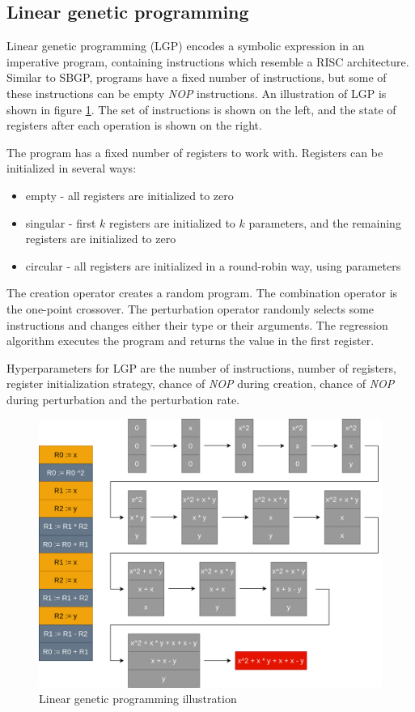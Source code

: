 \subsection{Linear genetic programming}

Linear genetic programming (LGP) \citep{lgp} encodes a symbolic expression in an imperative program, containing instructions which resemble a RISC architecture. Similar to SBGP, programs have a fixed number of instructions, but some of these instructions can be empty \textit{NOP} instructions. An illustration of LGP is shown in figure \ref{fig:lgp}. The set of instructions is shown on the left, and the state of registers after each operation is shown on the right.

The program has a fixed number of registers to work with. Registers can be initialized in several ways:
\begin{itemize}
	\item empty - all registers are initialized to zero
	\item singular - first $k$ registers are initialized to $k$ parameters, and the remaining registers are initialized to zero
	\item circular - all registers are initialized in a round-robin way, using parameters
\end{itemize}

The creation operator creates a random program. The combination operator is the one-point crossover. The perturbation operator randomly selects some instructions and changes either their type or their arguments. The regression algorithm executes the program and returns the value in the first register.

Hyperparameters for LGP are the number of instructions, number of registers, register initialization strategy, chance of \textit{NOP} during creation, chance of \textit{NOP} during perturbation and the perturbation rate.

\begin{figure}[!htbp]
	\centering
	\includegraphics[scale=0.25]{../images/lgp.png}
	\caption{Linear genetic programming illustration}
    \label{fig:lgp}
\end{figure}

